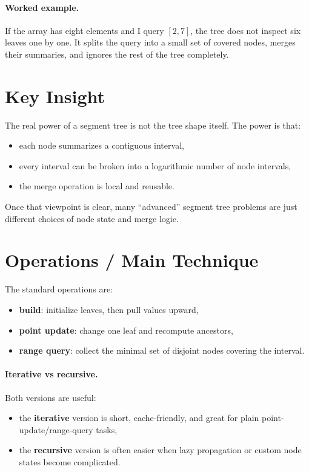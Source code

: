 \paragraph{Worked example.}
If the array has eight elements and I query \([2, 7]\), the tree does not inspect six leaves one by one. It splits the
query into a small set of covered nodes, merges their summaries, and ignores the rest of the tree completely.

\section*{Key Insight}

The real power of a segment tree is not the tree shape itself. The power is that:

\begin{itemize}
  \item each node summarizes a contiguous interval,
  \item every interval can be broken into a logarithmic number of node intervals,
  \item the merge operation is local and reusable.
\end{itemize}

Once that viewpoint is clear, many ``advanced'' segment tree problems are just different choices of node state and
merge logic.

\section*{Operations / Main Technique}

The standard operations are:

\begin{itemize}
  \item \textbf{build}: initialize leaves, then pull values upward,
  \item \textbf{point update}: change one leaf and recompute ancestors,
  \item \textbf{range query}: collect the minimal set of disjoint nodes covering the interval.
\end{itemize}

\paragraph{Iterative vs recursive.}
Both versions are useful:

\begin{itemize}
  \item the \textbf{iterative} version is short, cache-friendly, and great for plain point-update/range-query tasks,
  \item the \textbf{recursive} version is often easier when lazy propagation or custom node states become complicated.
\end{itemize}

